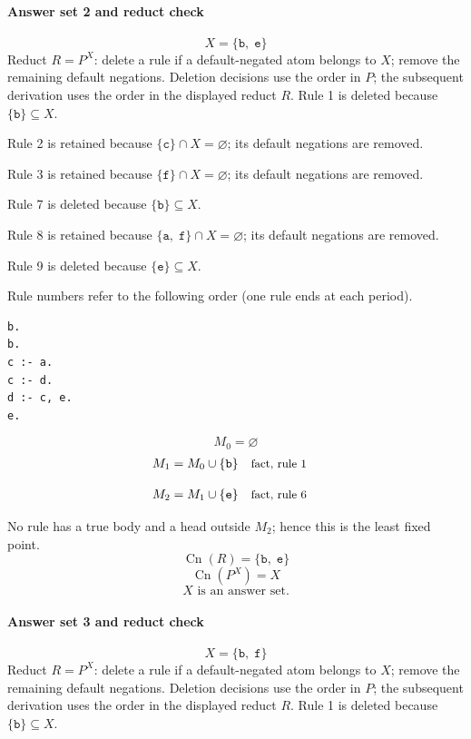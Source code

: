 \documentclass[a4paper,11pt]{article}
\newif\ifexplain
\newcommand{\explain}[1]{\ifexplain\begin{erklbox}#1\end{erklbox}\fi}
\newcommand{\why}[1]{\text{\small #1}}
\newcommand{\at}[1]{\texttt{#1}}
\begin{document}
\paragraph{Answer set 2 and reduct check}
\[
X=\{\at{b},\;\at{e}\}
\]
Reduct $R=P^X$: delete a rule if a default-negated atom belongs to $X$; remove the remaining default negations. Deletion decisions use the order in $P$; the subsequent derivation uses the order in the displayed reduct $R$.
Rule 1 is deleted because $\{\at{b}\}\subseteq X$.

Rule 2 is retained because $\{\at{c}\}\cap X=\varnothing$; its default negations are removed.

Rule 3 is retained because $\{\at{f}\}\cap X=\varnothing$; its default negations are removed.

Rule 7 is deleted because $\{\at{b}\}\subseteq X$.

Rule 8 is retained because $\{\at{a},\;\at{f}\}\cap X=\varnothing$; its default negations are removed.

Rule 9 is deleted because $\{\at{e}\}\subseteq X$.

Rule numbers refer to the following order (one rule ends at each period).
\begin{small}
\begin{verbatim}
b.
b.
c :- a.
c :- d.
d :- c, e.
e.
\end{verbatim}
\end{small}
\explain{Beim Redukt bleibt die Kandidatenmenge fest. Wir entscheiden zuerst, welche Regeln wegfallen. Erst danach berechnen wir aus den verbleibenden positiven Regeln die kleinste abgeschlossene Menge. Ein Modell allein reicht nicht: Diese Menge muss genau der Kandidat sein.}
\[
M_0=\varnothing
\]
\begin{align*}
M_{1} &= M_{0}\cup \{\at{b}\} && \why{fact, rule 1}
\end{align*}
\explain{Diese Regel hat keinen Körper. Ihr Kopf $\at{b}$ ist damit ein Fakt und muss in die Menge.}
\begin{align*}
M_{2} &= M_{1}\cup \{\at{e}\} && \why{fact, rule 6}
\end{align*}
\explain{Diese Regel hat keinen Körper. Ihr Kopf $\at{e}$ ist damit ein Fakt und muss in die Menge.}
No rule has a true body and a head outside $M_{2}$; hence this is the least fixed point.
\[
\operatorname{Cn}(R)=\{\at{b},\;\at{e}\}
\]
\[
\operatorname{Cn}(P^X)=X
\]
\[
\boxed{X\text{ is an answer set.}}
\]
\paragraph{Answer set 3 and reduct check}
\[
X=\{\at{b},\;\at{f}\}
\]
Reduct $R=P^X$: delete a rule if a default-negated atom belongs to $X$; remove the remaining default negations. Deletion decisions use the order in $P$; the subsequent derivation uses the order in the displayed reduct $R$.
Rule 1 is deleted because $\{\at{b}\}\subseteq X$.
\end{document}
